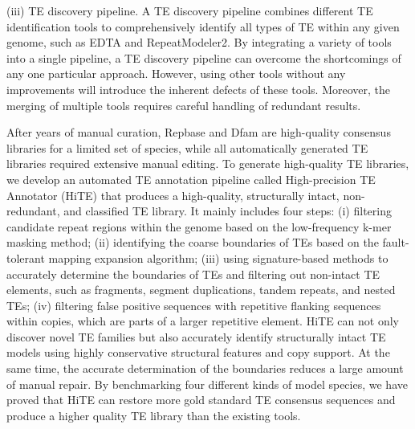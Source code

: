 \documentclass{bmcart}
\begin{document}
(iii) TE discovery pipeline. A TE discovery pipeline combines different TE identification tools to comprehensively identify all types of TE within any given genome, such as EDTA\cite{ou2019benchmarking} and RepeatModeler2\cite{flynn2020repeatmodeler2}. By integrating a variety of tools into a single pipeline, a TE discovery pipeline can overcome the shortcomings of any one particular approach. However, using other tools without any improvements will introduce the inherent defects of these tools. Moreover, the merging of multiple tools requires careful handling of redundant results.

After years of manual curation, Repbase\cite{bao2015repbase} and Dfam\cite{hubley2016dfam} are high-quality consensus libraries for a limited set of species, while all automatically generated TE libraries required extensive manual editing. To generate high-quality TE libraries, we develop an automated TE annotation pipeline called High-precision TE Annotator (HiTE) that produces a high-quality, structurally intact, non-redundant, and classified TE library. It mainly includes four steps: (i) filtering candidate repeat regions within the genome based on the low-frequency k-mer masking method; (ii) identifying the coarse boundaries of TEs based on the fault-tolerant mapping expansion algorithm; (iii) using signature-based methods to accurately determine the boundaries of TEs and filtering out non-intact TE elements, such as fragments, segment duplications, tandem repeats, and nested TEs; (iv) filtering false positive sequences with repetitive flanking sequences within copies, which are parts of a larger repetitive element. HiTE can not only discover novel TE families but also accurately identify structurally intact TE models using highly conservative structural features and copy support. At the same time, the accurate determination of the boundaries reduces a large amount of manual repair. By benchmarking four different kinds of model species, we have proved that HiTE can restore more gold standard TE consensus sequences and produce a higher quality TE library than the existing tools.

\end{document}
